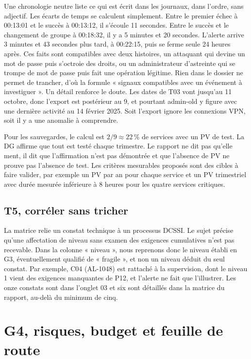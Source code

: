 \documentclass[11pt,a4paper]{article}
\begin{document}
Une chronologie neutre liste ce qui est écrit dans les journaux, dans l'ordre, sans adjectif. Les écarts de temps se calculent simplement. Entre le premier échec à 00:13:01 et le succès à 00:13:12, il s'écoule 11 secondes. Entre le succès et le changement de groupe à 00:18:32, il y a 5 minutes et 20 secondes. L'alerte arrive 3 minutes et 43 secondes plus tard, à 00:22:15, puis se ferme seule 24 heures après. Ces faits sont compatibles avec deux histoires, un attaquant qui devine un mot de passe puis s'octroie des droits, ou un administrateur d'astreinte qui se trompe de mot de passe puis fait une opération légitime. Rien dans le dossier ne permet de trancher, d'où la formule « signaux compatibles avec un événement à investiguer ». Un détail renforce le doute. Les dates de T03 vont jusqu'au 11 octobre, donc l'export est postérieur au 9, et pourtant admin-old y figure avec une dernière activité au 14 février 2025. Soit l'export ignore les connexions VPN, soit il y a une anomalie à comprendre.

Pour les sauvegardes, le calcul est $2 / 9 \approx 22\,\%$ de services avec un PV de test. La DG affirme que tout est testé chaque trimestre. Le rapport ne dit pas qu'elle ment, il dit que l'affirmation n'est pas démontrée et que l'absence de PV ne prouve pas l'absence de test. Les critères mesurables proposés sont des cibles à faire valider, par exemple un PV par an pour chaque service et un PV trimestriel avec durée mesurée inférieure à 8 heures pour les quatre services critiques.

\subsection{T5, corréler sans tricher}

La matrice relie un constat technique à un processus DCSSI. Le sujet précise qu'une affectation de niveau sans examen des exigences cumulatives n'est pas recevable. Dans la colonne « niveau », nous reprenons donc le niveau établi en G3, éventuellement qualifié de « fragile », et non un niveau déduit du seul constat. Par exemple, C04 (AL-1048) est rattaché à la supervision, dont le niveau 1 vient des exigences manquantes de P12, et l'alerte ne fait que l'illustrer. Les onze constats sont dans l'onglet 03 et six sont détaillés dans la matrice du rapport, au-delà du minimum de cinq.

\section{G4, risques, budget et feuille de route}
\end{document}
